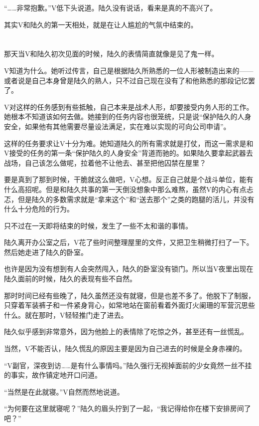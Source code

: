 “……非常抱歉。”V低下头说道。陆久没有说话，看来是真的不高兴了。

其实V和陆久的第一天相处，就是在让人尴尬的气氛中结束的。



\section*{}

那天当V和陆久初次见面的时候，陆久的表情简直就像是见了鬼一样。

V知道为什么。她听过传言，自己是根据陆久所熟悉的一位人形被制造出来的——或者说是自己本身曾是陆久的熟人，只不过自己现在没有了和他熟悉的那段记忆罢了。

V对这样的任务感到有些抵触，自己本来是战术人形，却要接受内务人形的工作。她根本不知道该如何去做。她接到的任务内容也很笼统，只是说“保护陆久的人身安全，如果他有其他需要尽量设法满足，实在难以实现的可向公司申请”。

这样的任务要求让V十分为难。她知道陆久的所有需求就是打仗，而这一需求是和V接受的任务的第一条“保护陆久的人身安全”背道而驰的。如果陆久要拿起武器去战场，自己该怎么做呢，拉着他不让他去、甚至把他囚禁在屋里？

要是真到了那到时候，干脆就这么做吧，V心想。反正自己就是个战斗单位，能有什么高招呢。但是和陆久共事的第一天倒没想象中那么难熬，虽然V的内心有点忐忑，但是陆久的多数需求就是“拿来这个”和“送去那个”之类的跑腿的活儿，并没有什么十分危险的行为。

只不过在一天即将结束的时候，发生了一些不太和谐的事情。

陆久离开办公室之后，V花了些时间整理屋里的文件，又把卫生稍微打扫了一下。然后她走进了陆久的卧室。

也许是因为没有想到有人会突然闯入，陆久的卧室没有锁门。所以当V夜里出现在陆久面前的时候，陆久的表现有些不自然。

那时时间已经有些晚了，陆久虽然还没有就寝，但是也差不多了。他脱下了制服，只穿着军装裤子和一件紧身背心，如常地站在窗前看着外面灯火阑珊的军营沉思些什么。就在那时，V轻轻推门走了进去。

陆久似乎感到非常意外，因为他脸上的表情除了吃惊之外，甚至还有一丝慌乱。

当然，V不能否认，陆久慌乱的原因主要是因为自己进去的时候是全身赤裸的。

“V副官，深夜到访……是有什么事情吗。”陆久强行无视掉面前的少女竟然一丝不挂的事实，故作镇定地开口问道。

“当然是在此就寝。”V自然而然地说道。

“为何要在这里就寝呢？”陆久的眉头拧到了一起，“我记得给你在楼下安排房间了吧？”

